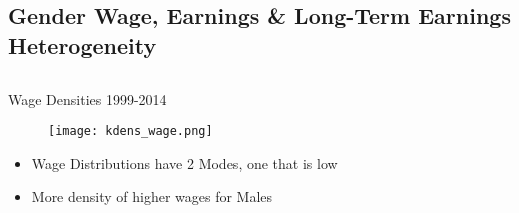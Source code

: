 \documentclass[hyperref={bookmarks=false}]{beamer}
\begin{document}
\begin{appendix}
%


\section{Gender Wage, Earnings \& Long-Term Earnings Heterogeneity}
\subsection{}

\begin{frame}
\label{FEMHET}
\end{frame}

\begin{frame}{Wage Densities}
1999-2014
\begin{figure}[!t]
\centering
\begin{minipage}[b]{0.32\textwidth}{}
\centering
\texttt{[image: kdens\_wage.png]}
\end{minipage}
\end{figure}
\begin{itemize}
\setlength{\itemsep}{0.7 cm}
\item Wage Distributions have 2 Modes, one that is low
\item More density of higher wages for Males
\end{itemize}
\end{frame}


\end{appendix}
\end{document}
